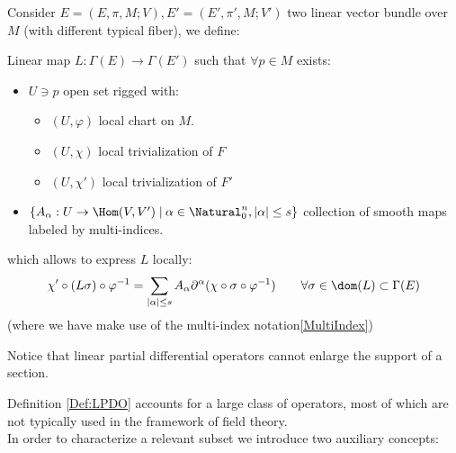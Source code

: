 \documentclass[Main]{subfiles}
\begin{document}
		Consider $E=(E,\pi,M;V), E'=(E',\pi',M;V')$ two linear vector bundle over $M$ (with different typical fiber), we define:
		\begin{definition}\label{Def:LPDO}
			Linear map $L:\Gamma(E)\rightarrow \Gamma(E')$ such that $\forall p \in M$ exists:
		\begin{itemize}
			\item $U \ni p$ open set rigged with:
				\begin{itemize}
					\item $(U, \varphi )$ local chart on $M$.
					\item $(U, \chi)$ local trivialization of $F$
					\item $(U, \chi')$ local trivialization of $F'$
				\end{itemize}
			\item $\{A_\alpha :U \rightarrow \Hom(V,V')\; \vert \: \alpha \in \Natural_0^n, \vert \alpha \vert \leq s \}$ collection of smooth maps labeled by multi-indices.
		\end{itemize}
		which allows to express $L$ locally:
		\begin{displaymath}
			\chi' \circ ( L \sigma) \circ \varphi^{-1} =
			\sum_{\vert \alpha \vert \leq s} A_\alpha \partial^\alpha (\chi \circ \sigma \circ \varphi^{-1} ) 
			\qquad \forall \sigma \in \dom(L) \subset \Gamma(E)
		\end{displaymath}
		(where we have make use of the multi-index notation\ref{MultiIndex})
	\end{definition}
		\begin{observation}\label{Obs:EnlargeSupport}
			Notice that linear partial differential operators cannot enlarge the support of a section.
		\end{observation}
		
		Definition \ref{Def:LPDO} accounts for a large class of operators, most of which are not typically used in the framework of field theory.\\
		In order to characterize a relevant subset we introduce two auxiliary concepts:
		
\end{document}
